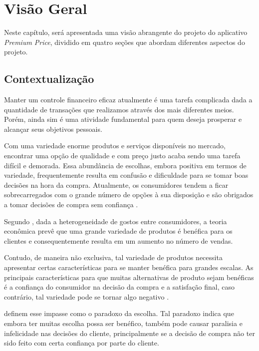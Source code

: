 \chapter{Visão Geral} \label{cha:visaogeral}
Neste capítulo, será apresentada uma visão abrangente do projeto do aplicativo \textit{Premium Price}, dividido em quatro seções que abordam diferentes aspectos do projeto.

\section{Contextualização} \label{sec:contextualizacao}

Manter um controle financeiro eficaz atualmente é uma tarefa complicada dada a quantidade de transações que realizamos através dos mais diferentes meios. Porém, ainda sim é uma atividade fundamental para quem deseja prosperar e alcançar seus objetivos pessoais.

Com uma variedade enorme produtos e serviços disponíveis no mercado, encontrar uma opção de qualidade e com preço justo acaba sendo uma tarefa difícil e demorada. Essa abundância de escolhas, embora positiva em termos de variedade, frequentemente resulta em confusão e dificuldade para se tomar boas decisões na hora da compra. Atualmente, os consumidores tendem a ficar sobrecarregados com o grande número de opções à sua disposição e são obrigados a tomar decisões de compra sem confiança \cite{huber2012dazing, nicholls2006purchase}.

Segundo \textcite{heitmann2007effect}, dada a heterogeneidade de gostos entre consumidores, a teoria econômica prevê que uma grande variedade de produtos é benéfica para os clientes e consequentemente resulta em um aumento no número de vendas.

Contudo, de maneira não exclusiva, tal variedade de produtos necessita apresentar certas características para se manter benéfica para grandes escalas. As principais características para que muitas alternativas de produto sejam benéficas é a confiança do consumidor na decisão da compra e a satisfação final, caso contrário, tal variedade pode se tornar algo negativo \cite{schwartz2002maximizing}.

\textcite{tang2017purchase} definem esse impasse como o paradoxo da escolha. Tal paradoxo indica que embora ter muitas escolha possa ser benéfico, também pode causar paralisia e infelicidade nas decisões do cliente, principalmente se a decisão de compra não ter sido feito com certa confiança por parte do cliente. 

